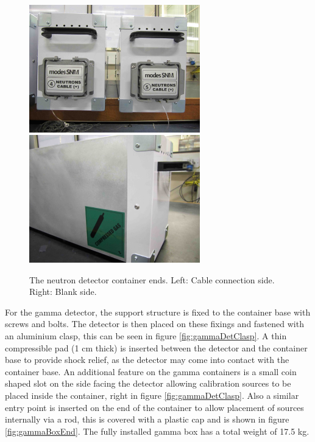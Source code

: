 \begin{figure}[htbp]
\begin{center}
\includegraphics[width=74mm]{Chapter6/figures/neutronContainerEnd1.jpg}
\includegraphics[width=74mm]{Chapter6/figures/neutronContainerEnd2.jpg}
\caption{The neutron detector container ends. Left: Cable connection side. Right: Blank side.}
\label{fig:neutronBoxEnd}
\end{center}
\end{figure}

For the gamma detector, the support structure is fixed to the container base with screws and bolts. The detector is then placed on these fixings and fastened with an aluminium clasp, this can be seen in figure \ref{fig:gammaDetClasp}. A thin compressible pad (1 cm thick) is inserted between the detector and the container base to provide shock relief, as the detector may come into contact with the container base. 
An additional feature on the gamma containers is a small coin shaped slot on the side facing the detector allowing calibration sources to be placed inside the container, right in figure \ref{fig:gammaDetClasp}. Also a similar entry point is inserted on the end of the container to allow placement of sources internally via a rod, this is covered with a plastic cap and is shown in figure \ref{fig:gammaBoxEnd}. The fully installed gamma box has a total weight of 17.5 kg.


